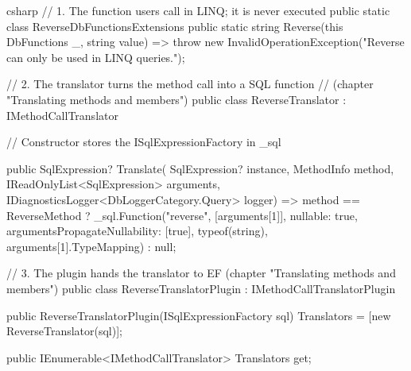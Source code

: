 \begin{sourcecode}{csharp}
// 1. The function users call in LINQ; it is never executed
public static class ReverseDbFunctionsExtensions
{
    public static string Reverse(this DbFunctions _, string value)
        => throw new InvalidOperationException("Reverse can only be used in LINQ queries.");
}

// 2. The translator turns the method call into a SQL function
//    (chapter "Translating methods and members")
public class ReverseTranslator : IMethodCallTranslator
{
    // Constructor stores the ISqlExpressionFactory in _sql

    public SqlExpression? Translate(
        SqlExpression? instance, MethodInfo method, IReadOnlyList<SqlExpression> arguments,
        IDiagnosticsLogger<DbLoggerCategory.Query> logger)
        => method == ReverseMethod
            ? _sql.Function("reverse", [arguments[1]], nullable: true,
                argumentsPropagateNullability: [true], typeof(string),
                arguments[1].TypeMapping)
            : null;
}

// 3. The plugin hands the translator to EF (chapter "Translating methods and members")
public class ReverseTranslatorPlugin : IMethodCallTranslatorPlugin
{
    public ReverseTranslatorPlugin(ISqlExpressionFactory sql)
    {
        Translators = [new ReverseTranslator(sql)];
    }

    public IEnumerable<IMethodCallTranslator> Translators { get; }
}
\end{sourcecode}


